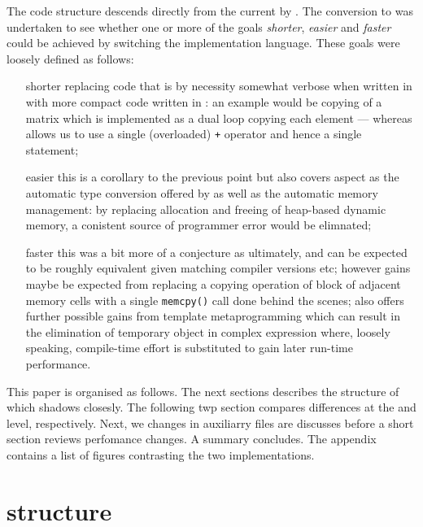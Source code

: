 \documentclass[nojss,shortnames,article]{jss}
\begin{document}
The code structure descends directly from the current  by
\cite{CRAN:DEoptim}.  The conversion to  was undertaken to see
whether one or more of the goals \textsl{shorter}, \textsl{easier}  and
\textsl{faster} could be achieved by switching the implementation
language. These goals were loosely defined as follows:
\begin{itemize}
\item[shorter] replacing code that is by necessity somewhat verbose when
  written in  with more compact code written in :
  an example would be copying of a matrix which is implemented as a dual loop
  copying each element --- whereas  allows us to use a single
  (overloaded) \verb|+| operator and hence a single statement;
\item[easier] this is a corollary to the previous point but also covers
  aspect as the automatic type conversion offered by  as well as
  the automatic memory management: by replacing allocation and freeing of
  heap-based dynamic memory, a conistent source of programmer error would be
  elimnated; 
\item[faster] this was a bit more of a conjecture as ultimately,
   and  can be expected to be roughly equivalent
  given matching compiler versions etc; however gains maybe be expected from
  replacing a copying operation of block of adjacent memory cells with a
  single \verb|memcpy()| call done behind the scenes; 
  also offers further possible gains from template metaprogramming which can
  result in the elimination of temporary object in complex expression where,
  loosely speaking, compile-time effort is substituted to gain later run-time
  performance. 
\end{itemize}

This paper is organised as follows. The next sections describes the structure
of  which  shadows closesly. The following twp
section compares differences at the  and  level,
respectively. Next, we changes in auxiliarry files are discusses before a
short section reviews perfomance changes. A summary concludes. The
appendix contains a list of figures contrasting the two implementations.

\section[DEoptim structure]{ structure}
\end{document}
